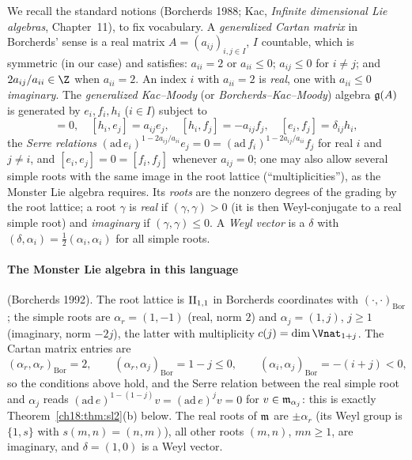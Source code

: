 We recall the standard notions (Borcherds 1988; Kac, \emph{Infinite dimensional Lie algebras}, Chapter~11), to fix
vocabulary.  A \emph{generalized Cartan matrix} in Borcherds' sense is a real matrix $A=(a_{ij})_{i,j\in I}$, $I$ countable,
which is symmetric (in our case) and satisfies: $a_{ii}=2$ or $a_{ii}\le0$; $a_{ij}\le0$ for $i\neq j$; and $2a_{ij}/a_{ii}\in\Z$ when
$a_{ii}=2$.  An index $i$ with $a_{ii}=2$ is \emph{real}, one with $a_{ii}\le0$ \emph{imaginary}.  The \emph{generalized Kac--Moody}
(or \emph{Borcherds--Kac--Moody}) algebra $\mathfrak{g}(A)$ is generated by $e_i,f_i,h_i$ ($i\in I$) subject to
\begin{equation*}
  [h_i,h_j]=0,\quad [h_i,e_j]=a_{ij}e_j,\quad [h_i,f_j]=-a_{ij}f_j,\quad [e_i,f_j]=\delta_{ij}h_i,
\end{equation*}
the \emph{Serre relations} $(\mathrm{ad}\,e_i)^{1-2a_{ij}/a_{ii}}e_j=0=(\mathrm{ad}\,f_i)^{1-2a_{ij}/a_{ii}}f_j$ for real $i$ and $j\ne i$, and
$[e_i,e_j]=0=[f_i,f_j]$ whenever $a_{ij}=0$; one may also allow several simple roots with the same image in the root lattice
(``multiplicities''), as the Monster Lie algebra requires.  Its \emph{roots} are the nonzero degrees of the grading by the root
lattice; a root $\gamma$ is \emph{real} if $(\gamma,\gamma)>0$ (it is then Weyl-conjugate to a real simple root) and \emph{imaginary} if
$(\gamma,\gamma)\le0$.  A \emph{Weyl vector} is a $\delta$ with $(\delta,\alpha_i)=\frac12(\alpha_i,\alpha_i)$ for all simple roots.

\paragraph{The Monster Lie algebra in this language} (Borcherds 1992).  The root lattice is $\mathrm{II}_{1,1}$ in Borcherds coordinates
with $(\cdot,\cdot)_{\mathrm{Bor}}$; the simple roots are $\alpha_r=(1,-1)$ (real, norm $2$) and $\alpha_j=(1,j)$, $j\ge1$ (imaginary, norm
$-2j$), the latter with multiplicity $c(j)=\dim\Vnat_{1+j}$.  The Cartan matrix entries are
\begin{equation*}
  (\alpha_r,\alpha_r)_{\mathrm{Bor}}=2,\qquad (\alpha_r,\alpha_j)_{\mathrm{Bor}}=1-j\le0,\qquad (\alpha_i,\alpha_j)_{\mathrm{Bor}}=-(i+j)<0,
\end{equation*}
so the conditions above hold, and the Serre relation between the real simple root and $\alpha_j$ reads
$(\mathrm{ad}\,e)^{1-(1-j)}v=(\mathrm{ad}\,e)^jv=0$ for $v\in\mathfrak{m}_{\alpha_j}$: this is exactly Theorem~\ref{ch18:thm:sl2}(b) below.  The real roots of $\mathfrak{m}$
are $\pm\alpha_r$ (its Weyl group is $\{1,s\}$ with $s(m,n)=(n,m)$), all other roots $(m,n)$, $mn\ge1$, are imaginary, and
$\delta=(1,0)$ is a Weyl vector.

